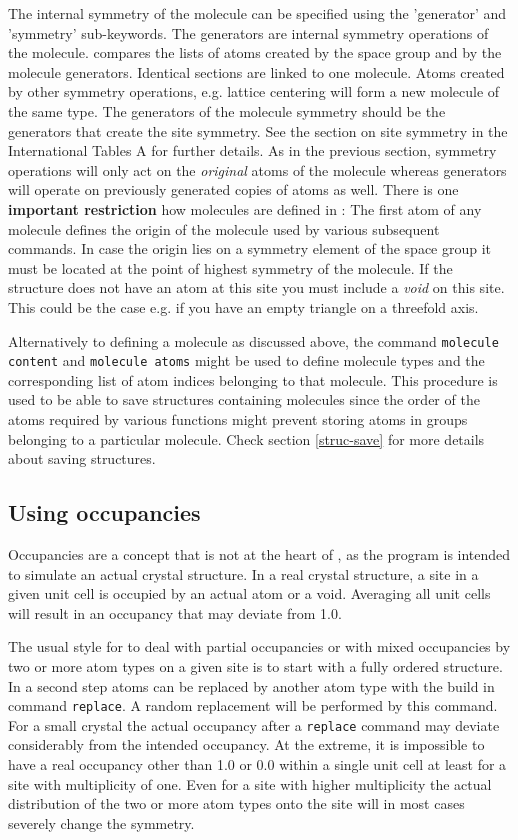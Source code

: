The internal symmetry of the molecule can be specified using the
'generator' and 'symmetry' sub-keywords.  The generators are
internal symmetry operations of the molecule.  \Discus compares
the lists of atoms created by the space group and by the molecule
generators.  Identical sections are linked to one molecule.  Atoms
created by other symmetry operations, e.g.  lattice centering will
form a new molecule of the same type.  The generators of the
molecule symmetry should be the generators that create the site
symmetry.  See the section on site symmetry in the International
Tables A \cite{tables} for further details.  As in the previous
section, symmetry operations will only act on the {\it original}
atoms of the molecule whereas generators will operate on previously
generated copies of atoms as well. There is one {\bf important
restriction} how molecules are defined in {\discus}: The first
atom of any molecule defines the origin of the molecule used by
various subsequent commands.  In case the origin lies on a symmetry
element of the space group it must be located at the point of
highest symmetry of the molecule.  If the structure does not have an
atom at this site you must include a {\it void} on this site.  This
could be the case e.g.  if you have an empty triangle on a threefold
axis.
\par

Alternatively to defining a molecule as discussed above, the command
{\tt molecule content} and {\tt molecule atoms} might be used to
define molecule types and the corresponding list of atom indices
belonging to that molecule. This procedure is used to be able to
save structures containing molecules since the order of the atoms
required by various \Discus functions might prevent storing
atoms in groups belonging to a particular molecule. Check section
\ref {struc-save} for more details about saving structures.

\subsection{Using occupancies \label{occ}}

Occupancies are a concept that is not at the heart of \discus, as
the program is intended to simulate an actual crystal structure. In
a real crystal structure, a site in a given unit cell is occupied by 
an actual atom or a void. Averaging all unit cells will result in 
an occupancy that may deviate from 1.0. 

The usual style for \Discus to deal with partial occupancies or
with mixed occupancies by two or more atom types on a given site is
to start with a fully ordered structure. In a second step atoms 
can be replaced by another atom type with the build in command
{\tt replace}. A random replacement will be performed by this 
command. For a small crystal the actual occupancy after a {\tt replace} 
command may deviate considerably from the intended occupancy. 
At the extreme, it is impossible to have a real occupancy other than
1.0 or 0.0 within a single unit cell at least for a site with 
multiplicity of one. Even for a site with higher multiplicity the actual 
distribution of the two or more atom types onto the site will in most cases 
severely change the symmetry. 

